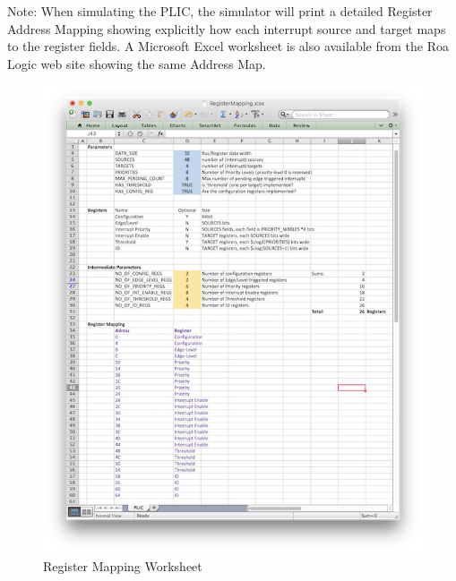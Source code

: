 Note: When simulating the PLIC, the simulator will print a detailed Register Address
Mapping showing explicitly how each interrupt source and target maps to the register fields. A Microsoft Excel worksheet is also available from the Roa Logic web site showing the same Address Map.

\begin{figure}[!ht]
\includegraphics{assets/img/AHB-Lite_PLIC_Worksheet.png}
\caption{Register Mapping Worksheet}
\label{fig:WORKSHEET}
\end{figure}

